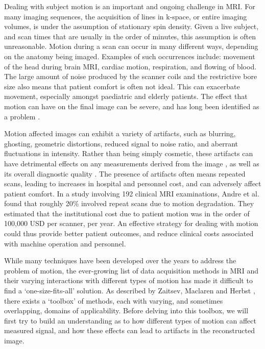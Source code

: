 \documentclass[class=article, crop=false]{standalone}
\begin{document}
Dealing with subject motion is an important and ongoing challenge in MRI. For many imaging sequences, the acquisition of lines in k-space, or entire imaging volumes, is under the assumption of stationary spin density. Given a live subject, and scan times that are usually in the order of minutes, this assumption is often unreasonable. Motion during a scan can occur in many different ways, depending on the anatomy being imaged. Examples of such occurrences include: movement of the head during brain MRI, cardiac motion, respiration, and flowing of blood. The large amount of noise produced by the scanner coils and the restrictive bore size also means that patient comfort is often not ideal. This can exacerbate movement, especially amongst paediatric and elderly patients. The effect that motion can have on the final image can be severe, and has long been identified as a problem \parencite{Bellon1986}.
\par
Motion affected images can exhibit a variety of artifacts, such as blurring, ghosting, geometric distortions, reduced signal to noise ratio, and aberrant fluctuations in intensity. Rather than being simply cosmetic, these artifacts can have detrimental effects on any measurements derived from the image \parencite{Gedamu2012,LeBihan2006,Reuter2015a}, as well as its overall diagnostic quality \parencite{Dantendorfer1997}. The presence of artifacts often means repeated scans, leading to increases in hospital and personnel cost, and can adversely affect patient comfort. In a study involving 192 clinical MRI examinations, Andre et al. \parencite*{Andre2015} found that roughly 20\% involved repeat scans due to motion degradation. They estimated that the institutional cost due to patient motion was in the order of 100,000 USD per scanner, per year. An effective strategy for dealing with motion could thus provide better patient outcomes, and reduce clinical costs associated with machine operation and personnel.
\par
While many techniques have been developed over the years to address the problem of motion, the ever-growing list of data acquisition methods in MRI and their varying interactions with different types of motion has made it difficult to find a ‘one-size-fits-all’ solution. As described by Zaitsev, Maclaren and Herbst \parencite*{Zaitsev2015a}, there exists a ‘toolbox’ of methods, each with varying, and sometimes overlapping, domains of applicability. Before delving into this toolbox, we will first try to build an understanding as to how different types of motion can affect measured signal, and how these effects can lead to artifacts in the reconstructed image.
\end{document}

